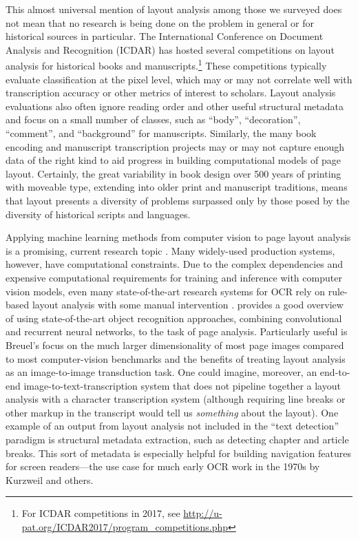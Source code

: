 \documentclass[twoside,11pt]{report}
\begin{document}
This almost universal mention of layout analysis among those we surveyed does not mean that no research is being done on the problem in general or for historical sources in particular. The International Conference on Document Analysis and Recognition (ICDAR) has hosted several competitions on layout analysis for historical books and manuscripts.\footnote{For ICDAR competitions in 2017, see \url{http://u-pat.org/ICDAR2017/program_competitions.php}}  These competitions typically evaluate classification at the pixel level, which may or may not correlate well with transcription accuracy or other metrics of interest to scholars. Layout analysis evaluations also often ignore reading order and other useful structural metadata and focus on a small number of classes, such as ``body'', ``decoration'', ``comment'', and ``background'' for manuscripts. Similarly, the many book encoding and manuscript transcription projects may or may not capture enough data of the right kind to aid progress in building computational models of page layout. Certainly, the great variability in book design over 500 years of printing with moveable type, extending into older print and manuscript traditions, means that layout presents a diversity of problems surpassed only by those posed by the diversity of historical scripts and languages.

Applying machine learning methods from computer vision to page layout analysis is a promising, current research topic \citep[e.g.,][]{meier17:_fully_convol_neural_networ_newsp_artic_segmen,xu17:_page_segmen_histor_handw_docum,oliveira18}. Many widely-used production systems, however, have computational constraints. Due to the complex dependencies and expensive computational requirements for training and inference with computer vision models, even many state-of-the-art research systems for OCR rely on rule-based layout analysis with some manual intervention \citep{reul17:_larex}. \cite{breuel17:_robus_simpl_page_segmen_hybrid} provides a good overview of using state-of-the-art object recognition approaches, combining convolutional and recurrent neural networks, to the task of page analysis. Particularly useful is Breuel's focus on the much larger dimensionality of most page images compared to most computer-vision benchmarks and the benefits of treating layout analysis as an image-to-image transduction task. One could imagine, moreover, an end-to-end image-to-text-transcription system that does not pipeline together a layout analysis with a character transcription system (although requiring line breaks or other markup in the transcript would tell us \emph{something} about the layout). One example of an output from layout analysis not included in the ``text detection'' paradigm is structural metadata extraction, such as detecting chapter and article breaks. This sort of metadata is especially helpful for building navigation features for screen readers---the use case for much early OCR work in the 1970s by Kurzweil and others.
\end{document}
